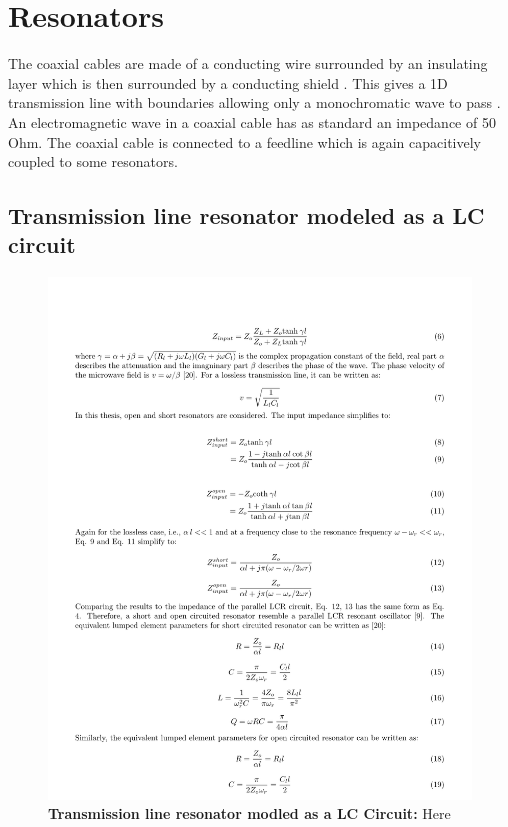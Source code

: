 \chapter{Resonators}\label{chap:Electromagnetic waves}
    The coaxial cables are made of a conducting wire surrounded by an insulating layer which is then surrounded by a conducting shield \cite{Griffiths2018}. This gives a 1D transmission line with boundaries allowing only a monochromatic wave to pass \cite{Schuster2007}. An electromagnetic wave in a coaxial cable has as standard an impedance of 50 Ohm\cite{Griffiths2018}. The coaxial cable is connected to a feedline which is again capacitively coupled to some resonators. 
    \section{Transmission line resonator modeled as a LC circuit}
        \begin{figure} [h]
            \centering
                \includegraphics[width = 13cm]{Images/Transmission line resonator modeled as a LC circuit.png}
                \caption[Transmission line resonator modled as a LC Circuit]{\textbf{Transmission line resonator modled as a LC Circuit:} Here}
                \label{LC circuit}
        \end{figure}
